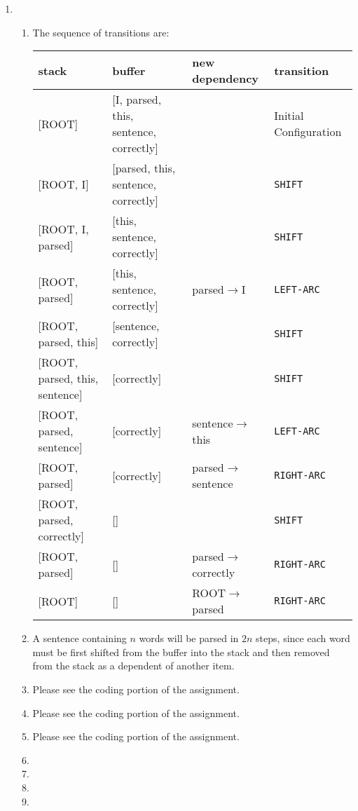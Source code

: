 \documentclass[10pt,reqno]{amsart}
\begin{document}
\begin{enumerate}[topsep=0pt,itemsep=3ex,partopsep=1ex,parsep=1ex]
\item
  \begin{enumerate}[itemsep=2ex]
  \item The sequence of transitions are:
    \vspace{1mm}
    \begin{center}
      \begin{tabular}{l|l|l|l}
        stack & buffer & new dependency & transition \\
        \hline
        {[ROOT]} & [I, parsed, this, sentence, correctly] &  & Initial Configuration \\
        {[ROOT, I]} & [parsed, this, sentence, correctly] &  & \texttt{SHIFT} \\
        {[ROOT, I, parsed]} & [this, sentence, correctly] &  & \texttt{SHIFT} \\
        {[ROOT, parsed]} & [this, sentence, correctly] & parsed$\to$I & \texttt{LEFT-ARC} \\
        {[ROOT, parsed, this]} & [sentence, correctly] &  & \texttt{SHIFT} \\
        {[ROOT, parsed, this, sentence]} & [correctly] &  & \texttt{SHIFT} \\
        {[ROOT, parsed, sentence]} & [correctly] & sentence$\to$this  & \texttt{LEFT-ARC} \\
        {[ROOT, parsed]} & [correctly] & parsed$\to$sentence  & \texttt{RIGHT-ARC} \\
        {[ROOT, parsed, correctly]} & [] &  & \texttt{SHIFT} \\
        {[ROOT, parsed]} & [] & parsed$\to$correctly & \texttt{RIGHT-ARC} \\
        {[ROOT]} & [] & ROOT$\to$parsed & \texttt{RIGHT-ARC} \\
      \end{tabular}
    \end{center}
    \vspace{1mm}
  \item A sentence containing $n$ words will be parsed in $2n$ steps,
    since each word must be first shifted from the buffer into the stack and
    then removed from the stack as a dependent of another item. 
  \item Please see the coding portion of the assignment.
  \item Please see the coding portion of the assignment.
  \item Please see the coding portion of the assignment.
  \item 
  \item 
  \item 
  \item 
  \end{enumerate}



\end{enumerate}
\end{document}
